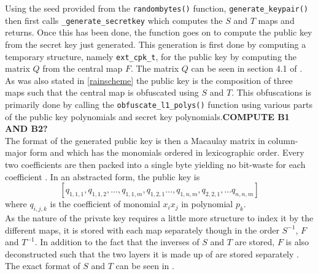 Using the seed provided from the \texttt{randombytes()} function, \texttt{generate\_keypair()} then first calls \texttt{\_generate\_secretkey} which computes the $S$ and $T$ maps and returns. Once this has been done, the function goes on to compute the public key from the secret key just generated. This generation is first done by computing a temporary structure, namely \texttt{ext\_cpk\_t}, for the public key by computing the matrix $Q$ from the central map $F$. The matrix $Q$ can be seen in section 4.1 of \cite{rainbownist}. As was also stated in \cref{rainscheme} the public key is the composition of three maps such that the central map is obfuscated using $S$ and $T$. This obfuscations is primarily done by calling the \texttt{obfuscate\_l1\_polys()} function using various parts of the public key polynomials and secret key polynomials.\textbf{COMPUTE B1 AND B2?}\medskip\\
The format of the generated public key is then a Macaulay matrix in column-major form and which has the monomials ordered in lexicographic order. Every two coefficients are then packed into a single byte yielding no bit-waste for each coefficient \cite{rainbownist}. In an abstracted form, the public key is
$$
    [q_{1,1,1}, q_{1,1,2}, \dots,q_{1,1,m},q_{1,2,1} \dots , q_{1,n,m}, q_{2,2,1}, \dots q_{n,n,m}]
$$
where $q_{i,j,k}$ is the coefficient of monomial $x_ix_j$ in polynomial $p_k$.\medskip\\
As the nature of the private key requires a little more structure to index it by the different maps, it is stored with each map separately though in the order $S^{-1}$, $F$ and $T^{-1}$. In addition to the fact that the inverses of $S$ and $T$ are stored, $F$ is also deconstructed such that the two layers it is made up of are stored separately \cite{rainbownist}. The exact format of $S$ and $T$ can be seen in \cite{rainbownist}.

